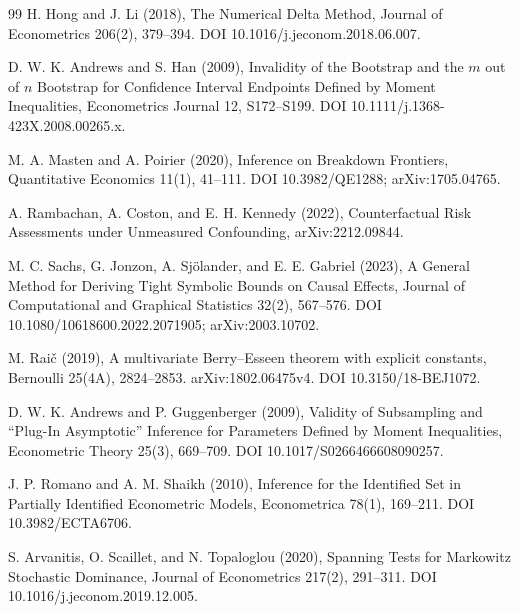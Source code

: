\documentclass{article}
\begin{document}
\begin{thebibliography}{99}
   H. Hong and J. Li (2018), The Numerical Delta Method, Journal of Econometrics 206(2), 379--394. DOI 10.1016/j.jeconom.2018.06.007.

   D. W. K. Andrews and S. Han (2009), Invalidity of the Bootstrap and the \(m\) out of \(n\) Bootstrap for Confidence Interval Endpoints Defined by Moment Inequalities, Econometrics Journal 12, S172--S199. DOI 10.1111/j.1368-423X.2008.00265.x.

   M. A. Masten and A. Poirier (2020), Inference on Breakdown Frontiers, Quantitative Economics 11(1), 41--111. DOI 10.3982/QE1288; arXiv:1705.04765.

   A. Rambachan, A. Coston, and E. H. Kennedy (2022), Counterfactual Risk Assessments under Unmeasured Confounding, arXiv:2212.09844.

   M. C. Sachs, G. Jonzon, A. Sjölander, and E. E. Gabriel (2023), A General Method for Deriving Tight Symbolic Bounds on Causal Effects, Journal of Computational and Graphical Statistics 32(2), 567--576. DOI 10.1080/10618600.2022.2071905; arXiv:2003.10702.

   M. Rai\v{c} (2019), A multivariate Berry--Esseen theorem with explicit constants, Bernoulli 25(4A), 2824--2853. arXiv:1802.06475v4. DOI 10.3150/18-BEJ1072.

   D. W. K. Andrews and P. Guggenberger (2009), Validity of Subsampling and ``Plug-In Asymptotic'' Inference for Parameters Defined by Moment Inequalities, Econometric Theory 25(3), 669--709. DOI 10.1017/S0266466608090257.

   J. P. Romano and A. M. Shaikh (2010), Inference for the Identified Set in Partially Identified Econometric Models, Econometrica 78(1), 169--211. DOI 10.3982/ECTA6706.

   S. Arvanitis, O. Scaillet, and N. Topaloglou (2020), Spanning Tests for Markowitz Stochastic Dominance, Journal of Econometrics 217(2), 291--311. DOI 10.1016/j.jeconom.2019.12.005.

\end{thebibliography}
\end{document}
